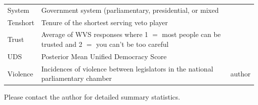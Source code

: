 \documentclass[a4paper]{article}\usepackage{graphicx, color}
\begin{document}
\begin{table}[!h]
\begin{center}
\begin{tabular}{l m{7cm} m{3.5cm}}
            System & Government system (parliamentary, presidential, or mixed & \cite{DPI2001} \\
            Tenshort & Tenure of the shortest serving veto player & \cite{DPI2001} \\
            Trust & Average of WVS responses where 1 $=$ most people can be trusted and 2 $=$ you can't be too careful & \cite{WVS2009} \\
            UDS & Posterior Mean Unified Democracy Score & \cite{Pemstein2010} \\
            Violence & Incidences of violence between legislators in the national parliamentary chamber & author \\
            \hline

    \end{tabular}
    \end{center}
    \begin{singlespace}
        Please contact the author for detailed summary statistics.
    \end{singlespace}
\end{table}  
\end{document}

